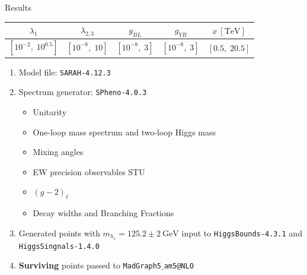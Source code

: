\documentclass[10pt,xcolor=dvipsnames,mathserif]{beamer}
\renewcommand{\(}{\left(}
\renewcommand{\)}{\right)}
\renewcommand{\[}{\left[}
\renewcommand{\]}{\right]}
\begin{document}
\begin{frame}{Results}
		\begin{table}[htb!]
			\begin{center}
				\begin{tabular}{ccccc}
					\toprule                     
				 $\lambda_1$ & $\lambda_{2,3}$ & $g_{BL}$ & $g_{YB}$ & $x~\mathrm{[TeV]}$  
				 \\       
					\midrule
				$\[10^{-2},\; 10^{0.5}
				\]$	& $\[10^{-8},\; 10
					\]$ 			    							& $\[10^{-8},\; 3
					\]$		& $\[10^{-8},\; 3
					\]$	&	$\[0.5,\; 20.5
					\]$ 	\\
					\bottomrule
				\end{tabular}  
			\end{center}
		\end{table} 
		\begin{enumerate}
			\item Model file: \texttt{SARAH-4.12.3}
			\item Spectrum generator: \texttt{SPheno-4.0.3}
			\begin{itemize}
				\item Unitarity
				\item One-loop mass spectrum and two-loop Higgs mass
				\item Mixing angles
				\item EW precision observables STU
				\item $\(g-2\)_\ell$
				\item Decay widths and Branching Fractions
			\end{itemize}
			\item Generated points with $m_{h_1} = 125.2 \pm 2~\mathrm{GeV}$ input to \texttt{HiggsBounds-4.3.1} and  \texttt{HiggsSingnals-1.4.0}
			\item \textbf{Surviving} points passed to \texttt{MadGraph5$\_$am5@NLO}
		\end{enumerate}
		
\end{frame}
\end{document}
